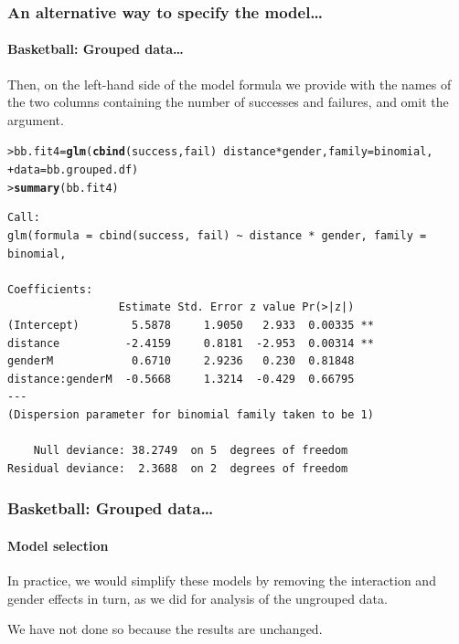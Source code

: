 \documentclass{beamer}\usepackage[]{graphicx}\usepackage[]{xcolor}
\makeatletter
\newcommand{\hlopt}[1]{\textcolor[rgb]{0,0,0}{#1}}%
\newcommand{\hlstd}[1]{\textcolor[rgb]{0.345,0.345,0.345}{#1}}%
\newcommand{\hlkwb}[1]{\textcolor[rgb]{0.69,0.353,0.396}{#1}}%
\newcommand{\hlkwc}[1]{\textcolor[rgb]{0.333,0.667,0.333}{#1}}%
\newcommand{\hlkwd}[1]{\textcolor[rgb]{0.737,0.353,0.396}{\textbf{#1}}}%
\newenvironment{kframe}{%
 \def\at@end@of@kframe{}%
 \ifinner\ifhmode%
  \def\at@end@of@kframe{\end{minipage}}%
  \begin{minipage}{\columnwidth}%
 \fi\fi%
 \def\FrameCommand##1{\hskip\@totalleftmargin \hskip-\fboxsep
 \colorbox{shadecolor}{##1}\hskip-\fboxsep
     \hskip-\linewidth \hskip-\@totalleftmargin \hskip\columnwidth}%
 \MakeFramed {\advance\hsize-\width
   \@totalleftmargin\z@ \linewidth\hsize
   \@setminipage}}%
 {\par\unskip\endMakeFramed%
 \at@end@of@kframe}
\newenvironment{knitrout}{}{} %
\makeatother
\begin{document}
\begin{frame}[fragile]
\frametitle{An alternative way to specify the model\ldots}
\framesubtitle{Basketball: Grouped data\ldots}
Then, on the left-hand side of the model formula we provide  with the names of the two columns containing the number of successes and failures, and omit the  argument.
\bigskip

\begin{knitrout}\scriptsize
{}\color{fgcolor}\begin{kframe}
\begin{alltt}
\hlstd{> }\hlstd{bb.fit4} \hlkwb{=} \hlkwd{glm}\hlstd{(}\hlkwd{cbind}\hlstd{(success, fail)} \hlopt{~} \hlstd{distance} \hlopt{*} \hlstd{gender,} \hlkwc{family} \hlstd{= binomial,}
\hlstd{+ }    \hlkwc{data} \hlstd{= bb.grouped.df)}
\hlstd{> }\hlkwd{summary}\hlstd{(bb.fit4)}
\end{alltt}
\end{kframe}
\end{knitrout}

\begin{knitrout}\scriptsize
{}\color{fgcolor}\begin{kframe}
\begin{verbatim}
Call:
glm(formula = cbind(success, fail) ~ distance * gender, family = binomial, 

Coefficients:
                 Estimate Std. Error z value Pr(>|z|)   
(Intercept)        5.5878     1.9050   2.933  0.00335 **
distance          -2.4159     0.8181  -2.953  0.00314 **
genderM            0.6710     2.9236   0.230  0.81848   
distance:genderM  -0.5668     1.3214  -0.429  0.66795   
---
(Dispersion parameter for binomial family taken to be 1)

    Null deviance: 38.2749  on 5  degrees of freedom
Residual deviance:  2.3688  on 2  degrees of freedom
\end{verbatim}
\end{kframe}
\end{knitrout}
\end{frame}



\begin{frame}
\frametitle{Basketball: Grouped data\ldots}
\framesubtitle{Model selection}
In practice, we would simplify these models by removing the interaction
and gender effects in turn, as we did for analysis of the ungrouped data.
\bigskip

We have not done so because the results are unchanged.

\end{frame}
\end{document}
